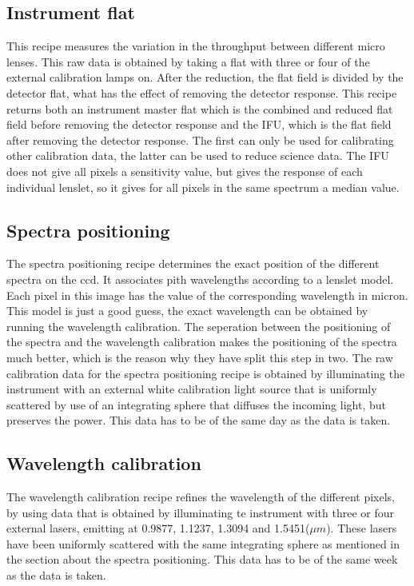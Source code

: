 \documentclass[twoside,single]{lion-msc}
\begin{document}
\subsection{Instrument flat}
This recipe measures the variation in the throughput between different micro lenses. This raw data is obtained by taking a flat with three or four of the external calibration lamps on. After the reduction, the flat field is divided by the detector flat, what has the effect of removing the detector response. This recipe returns both an instrument master flat which is the combined and reduced flat field before removing the detector response and the IFU, which is the flat field after removing the detector response. The first can only be used for calibrating other calibration data, the latter can be used to reduce science data. The IFU does not give all pixels a sensitivity value, but gives the response of each individual lenslet, so it gives for all pixels in the same spectrum a median value.

\subsection{Spectra positioning}
The spectra positioning recipe determines the exact position of the different spectra on the ccd. It associates pith wavelengths according to a lenslet model. Each pixel in this image has the value of the corresponding wavelength in micron. This model is just a good guess, the exact wavelength can be obtained by running the wavelength calibration. The seperation between the positioning of the spectra and the wavelength calibration makes the positioning of the spectra much better, which is the reason why they have split this step in two. The raw calibration data for the spectra positioning recipe is obtained by illuminating the instrument with an external white calibration light source that is uniformly scattered by use of an integrating sphere that diffuses the incoming light, but preserves the power. This data has to be of the same day as the data is taken.

\subsection{Wavelength calibration}
The wavelength calibration recipe refines the wavelength of the different pixels, by using data that is obtained by illuminating te instrument with three or four external lasers, emitting at 0.9877, 1.1237, 1.3094 and 1.5451($\mu m$). These lasers have been uniformly scattered with the same integrating sphere as mentioned in the section about the spectra positioning. This data has to be of the same week as the data is taken.\cite{Observatory2007}
\end{document}
